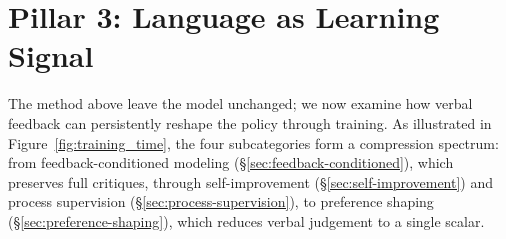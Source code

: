 \section{Pillar 3: Language as Learning Signal}%
\label{sec:pillar3}
The method above leave the model unchanged; we now examine how verbal feedback can persistently reshape the policy through training. As illustrated in Figure~\ref{fig:training_time}, the four subcategories form a compression spectrum: from feedback-conditioned modeling (\S\ref{sec:feedback-conditioned}), which preserves full critiques, through self-improvement (\S\ref{sec:self-improvement}) and process supervision (\S\ref{sec:process-supervision}), to preference shaping (\S\ref{sec:preference-shaping}), which reduces verbal judgement to a single scalar.




